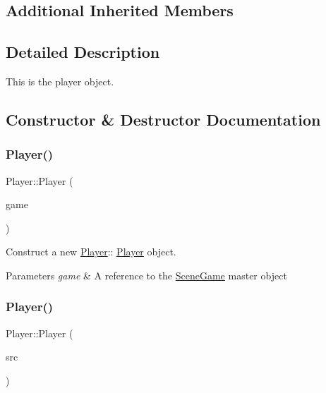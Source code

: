 \subsection*{Additional Inherited Members}


\subsection{Detailed Description}
This is the player object. 

\subsection{Constructor \& Destructor Documentation}
\mbox{\label{class_player_a290433592841cca95046b8c9dac7be86}} 
\subsubsection{\texorpdfstring{Player()}{Player()}\hspace{0.1cm}{\footnotesize\ttfamily [1/2]}}
{\footnotesize\ttfamily Player\+::\+Player (\begin{DoxyParamCaption}\item[{\hyperlink{class_scene_game}{Scene\+Game} \&}]{game }\end{DoxyParamCaption})\hspace{0.3cm}{\ttfamily [explicit]}}



Construct a new \hyperlink{class_player}{Player}\+:\+: \hyperlink{class_player}{Player} object. 


\begin{DoxyParams}{Parameters}
{\em game} & A reference to the \hyperlink{class_scene_game}{Scene\+Game} master object \\
\hline
\end{DoxyParams}
\mbox{\label{class_player_a2cf4315d62d84ddf41d86d76a9bb9294}} 
\subsubsection{\texorpdfstring{Player()}{Player()}\hspace{0.1cm}{\footnotesize\ttfamily [2/2]}}
{\footnotesize\ttfamily Player\+::\+Player (\begin{DoxyParamCaption}\item[{\hyperlink{class_player}{Player} const \&}]{src }\end{DoxyParamCaption})}



